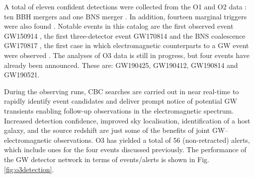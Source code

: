 \documentclass[binding=0.6cm, LaM]{sapthesis}
\begin{document}
	A total of eleven confident detections were collected from the O1 and O2 data \cite{13}: 
	ten BBH mergers \cite{14, 52, 58, 59, 60} and one BNS merger \cite{61}.  
	In addition, fourteen marginal triggers were also found \cite{13}.
	Notable events in this catalog are the first observed event GW150914 \cite{52},
	the first three-detector event GW170814 \cite{60} and the BNS
	coalescence GW170817 \cite{62}, the first case in which electromagnetic counterparts to a GW event 
	were observed \cite{15}.
        The analyses of O3 data is still in progress, but four events have already been announced.  
	These are: GW190425, GW190412, GW190814 and GW190521.

	During the observing runs, CBC searches are carried out in near real-time 
	to rapidly identify event candidates and deliver prompt notice of potential GW transients 
	enabling follow-up observations in the electromagnetic spectrum. 
	Increased detection confidence, improved sky localisation, identification of a host galaxy, 
	and the source redshift are just some of the benefits of joint GW–electromagnetic observations.  
	O3 has yielded a total of 56 (non-retracted) alerts, which include ones for the four events discussed previously.  
	The performance of the GW detector network in terms of events/alerts is shown in Fig.\,\ref{fig:o3detection}. 
\end{document}
